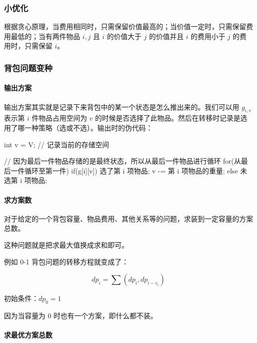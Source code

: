\subsubsection{小优化}\label{ux5c0fux4f18ux5316}

根据贪心原理，当费用相同时，只需保留价值最高的；当价值一定时，只需保留费用最低的；当有两件物品 \(i,j\) 且 \(i\) 的价值大于 \(j\) 的价值并且 \(i\) 的费用小于 \(j\) 的费用时，只需保留 \(i\)。

\subsubsection{背包问题变种}\label{ux80ccux5305ux95eeux9898ux53d8ux79cd}

\paragraph{输出方案}\label{ux8f93ux51faux65b9ux6848}

输出方案其实就是记录下来背包中的某一个状态是怎么推出来的。我们可以用 \(g_{i,v}\) 表示第 \(i\) 件物品占用空间为 \(v\) 的时候是否选择了此物品。然后在转移时记录是选用了哪一种策略（选或不选）。输出时的伪代码：


\begin{codeline}
int v = V; // 记录当前的存储空间

// 因为最后一件物品存储的是最终状态，所以从最后一件物品进行循环
for(从最后一件循环至第一件) {
    if(g[i][v]) {
        选了第 i 项物品;
        v -= 第 i 项物品的重量;
    } else {
        未选第 i 项物品;
    }
}
\end{codeline}


\paragraph{求方案数}\label{ux6c42ux65b9ux6848ux6570}

对于给定的一个背包容量、物品费用、其他关系等的问题，求装到一定容量的方案总数。

这种问题就是把求最大值换成求和即可。

例如 0-1 背包问题的转移方程就变成了：

\[
\mathit{dp}_i=\sum(\mathit{dp}_i,\mathit{dp}_{i-c_i})
\]

初始条件：\(\mathit{dp}_0=1\)

因为当容量为 \(0\) 时也有一个方案，即什么都不装。

\paragraph{求最优方案总数}\label{ux6c42ux6700ux4f18ux65b9ux6848ux603bux6570}

